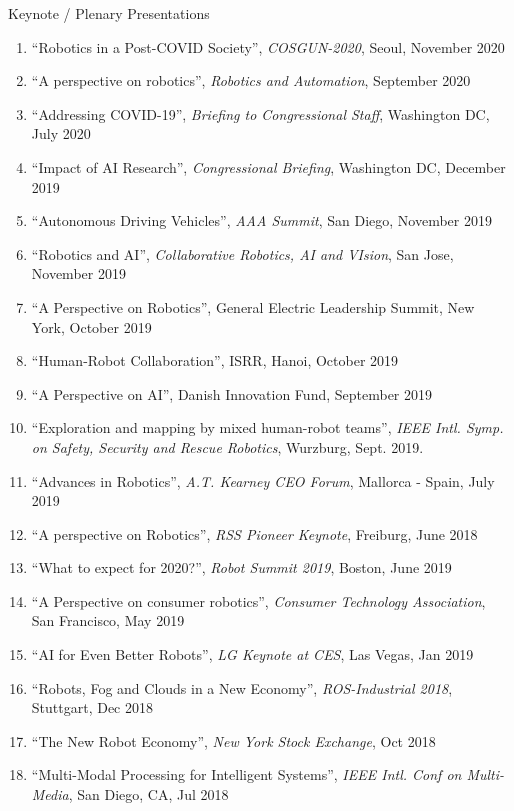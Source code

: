 \documentclass{article}
\begin{document}
\begin{cv}
\begin{cvlist}{Keynote / Plenary Presentations}
\item
  \begin{enumerate}
  \item ``Robotics in a Post-COVID Society'', {\em COSGUN-2020}, Seoul, November 2020
  \item ``A perspective on robotics'', {\em Robotics and Automation}, September 2020
  \item ``Addressing COVID-19'', {\em Briefing to Congressional Staff}, Washington DC, July 2020
  \item ``Impact of AI Research'', {\em Congressional Briefing}, Washington DC, December 2019
  \item ``Autonomous Driving Vehicles'', {\em AAA Summit}, San Diego, November 2019
  \item ``Robotics and AI'', {\em Collaborative Robotics, AI and VIsion}, San Jose, November 2019
  \item ``A Perspective on Robotics'', General Electric Leadership Summit, New York, October 2019
  \item ``Human-Robot Collaboration'', ISRR, Hanoi, October 2019
  \item ``A Perspective on AI'', Danish Innovation Fund, September 2019
  \item ``Exploration and mapping by mixed human-robot teams'', {\em IEEE Intl. Symp. on Safety, Security and Rescue Robotics},
      Wurzburg, Sept. 2019. 
  \item  ``Advances in Robotics'', {\em A.T. Kearney CEO Forum}, Mallorca - Spain, July 2019
  \item ``A perspective on Robotics'', {\em RSS Pioneer Keynote}, Freiburg, June 2018
  \item ``What to expect for 2020?'', {\em Robot Summit 2019}, Boston, June 2019
  \item ``A Perspective on consumer robotics'', {\em Consumer Technology Association}, San Francisco, May 2019
  \item ``AI for Even Better Robots'', {\em LG Keynote at CES}, Las Vegas, Jan 2019
  \item ``Robots, Fog and Clouds in a New Economy'', {\em ROS-Industrial 2018}, Stuttgart, Dec 2018
  \item ``The New Robot Economy'', {\em New York Stock Exchange}, Oct 2018
  \item ``Multi-Modal Processing for Intelligent Systems'', {\em IEEE Intl. Conf on Multi-Media}, San Diego, CA, Jul 2018

\end{enumerate}
\end{cvlist}
\end{cv}
\end{document}
